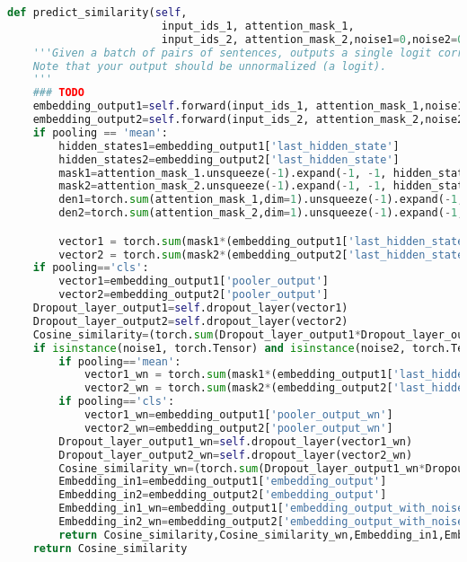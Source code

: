 \begin{lstlisting}[language=Python, caption={predict similarity method in Multitask BERT class}, label={lst:predict_similarity}, basicstyle=\ttfamily\small, keywordstyle=\color{blue}, commentstyle=\color{green}, stringstyle=\color{red},linewidth=\textwidth]
def predict_similarity(self,
                        input_ids_1, attention_mask_1,
                        input_ids_2, attention_mask_2,noise1=0,noise2=0,pooling='mean'):
    '''Given a batch of pairs of sentences, outputs a single logit corresponding to how similar they are.
    Note that your output should be unnormalized (a logit).
    '''
    ### TODO
    embedding_output1=self.forward(input_ids_1, attention_mask_1,noise1)
    embedding_output2=self.forward(input_ids_2, attention_mask_2,noise2)
    if pooling == 'mean':
        hidden_states1=embedding_output1['last_hidden_state']
        hidden_states2=embedding_output2['last_hidden_state']
        mask1=attention_mask_1.unsqueeze(-1).expand(-1, -1, hidden_states1.shape[2]).float()
        mask2=attention_mask_2.unsqueeze(-1).expand(-1, -1, hidden_states1.shape[2]).float()
        den1=torch.sum(attention_mask_1,dim=1).unsqueeze(-1).expand(-1, hidden_states1.shape[2])+1e-9
        den2=torch.sum(attention_mask_2,dim=1).unsqueeze(-1).expand(-1, hidden_states1.shape[2])+1e-9

        vector1 = torch.sum(mask1*(embedding_output1['last_hidden_state']), dim=1)/den1
        vector2 = torch.sum(mask2*(embedding_output2['last_hidden_state']), dim=1)/den2
    if pooling=='cls':
        vector1=embedding_output1['pooler_output']
        vector2=embedding_output2['pooler_output']
    Dropout_layer_output1=self.dropout_layer(vector1)
    Dropout_layer_output2=self.dropout_layer(vector2)
    Cosine_similarity=(torch.sum(Dropout_layer_output1*Dropout_layer_output2,dim=1)/((torch.norm(Dropout_layer_output1,dim=1)*torch.norm(Dropout_layer_output2,dim=1)))+1+1e-8)*2.5
    if isinstance(noise1, torch.Tensor) and isinstance(noise2, torch.Tensor):
        if pooling=='mean':
            vector1_wn = torch.sum(mask1*(embedding_output1['last_hidden_state_wn']), dim=1)/den1
            vector2_wn = torch.sum(mask2*(embedding_output2['last_hidden_state_wn']), dim=1)/den2
        if pooling=='cls':
            vector1_wn=embedding_output1['pooler_output_wn']
            vector2_wn=embedding_output2['pooler_output_wn']        
        Dropout_layer_output1_wn=self.dropout_layer(vector1_wn)
        Dropout_layer_output2_wn=self.dropout_layer(vector2_wn)
        Cosine_similarity_wn=(torch.sum(Dropout_layer_output1_wn*Dropout_layer_output2_wn,dim=1)/((torch.norm(Dropout_layer_output1_wn,dim=1)*torch.norm(Dropout_layer_output2_wn,dim=1)))+1+1e-8)*2.5
        Embedding_in1=embedding_output1['embedding_output']
        Embedding_in2=embedding_output2['embedding_output'] 
        Embedding_in1_wn=embedding_output1['embedding_output_with_noise']
        Embedding_in2_wn=embedding_output2['embedding_output_with_noise']
        return Cosine_similarity,Cosine_similarity_wn,Embedding_in1,Embedding_in2,Embedding_in1_wn,Embedding_in2_wn
    return Cosine_similarity
\end{lstlisting}

